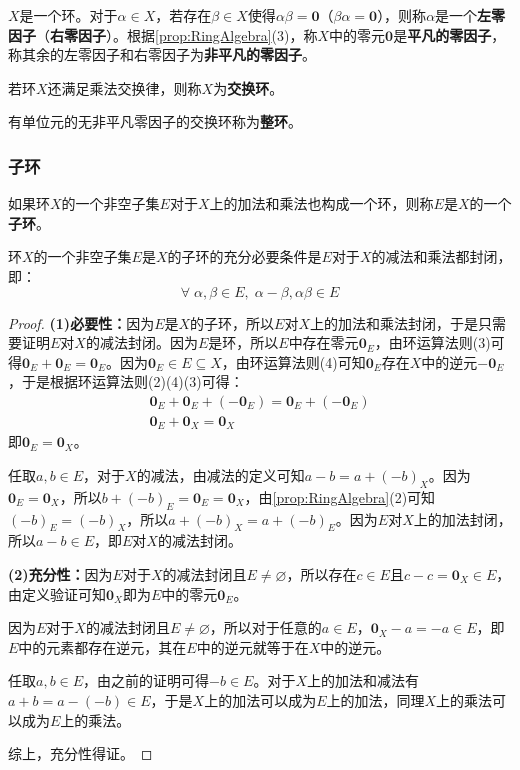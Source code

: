 \begin{definition}
	$X$是一个环。对于$\alpha\in X$，若存在$\beta\in X$使得$\alpha\beta=\mathbf{0}$（$\beta\alpha=\mathbf{0}$），则称$\alpha$是一个\textbf{左零因子}（\textbf{右零因子}）。根据\cref{prop:RingAlgebra}(3)，称$X$中的零元$\mathbf{0}$是\textbf{平凡的零因子}，称其余的左零因子和右零因子为\textbf{非平凡的零因子}。
\end{definition}
\begin{definition}
	若环$X$还满足乘法交换律，则称$X$为\textbf{交换环}。
\end{definition}
\begin{definition}
	有单位元的无非平凡零因子的交换环称为\textbf{整环}。
\end{definition}
\subsubsection{子环}
\begin{definition}
	如果环$X$的一个非空子集$E$对于$X$上的加法和乘法也构成一个环，则称$E$是$X$的一个\textbf{子环}。
\end{definition}
\begin{theorem}
	环$X$的一个非空子集$E$是$X$的子环的充分必要条件是$E$对于$X$的减法和乘法都封闭，即：
	\begin{equation*}
		\forall\;\alpha,\beta\in E,\;\alpha-\beta,\alpha\beta\in E
	\end{equation*}
\end{theorem}
\begin{proof}
	\textbf{(1)必要性：}因为$E$是$X$的子环，所以$E$对$X$上的加法和乘法封闭，于是只需要证明$E$对$X$的减法封闭。因为$E$是环，所以$E$中存在零元$\mathbf{0}_E$，由环运算法则(3)可得$\mathbf{0}_E+\mathbf{0}_E=\mathbf{0}_E$。因为$\mathbf{0}_E\in E\subseteq X$，由环运算法则(4)可知$\mathbf{0}_E$存在$X$中的逆元$-\mathbf{0}_E$，于是根据环运算法则(2)(4)(3)可得：
	\begin{gather*}
		\mathbf{0}_E+\mathbf{0}_E+(-\mathbf{0}_E)=\mathbf{0}_E+(-\mathbf{0}_E) \\
		\mathbf{0}_E+\mathbf{0}_X=\mathbf{0}_X
	\end{gather*}
	即$\mathbf{0}_E=\mathbf{0}_X$。\par
	任取$a,b\in E$，对于$X$的减法，由减法的定义可知$a-b=a+(-b)_X$。因为$\mathbf{0}_E=\mathbf{0}_X$，所以$b+(-b)_E=\mathbf{0}_E=\mathbf{0}_X$，由\cref{prop:RingAlgebra}(2)可知$(-b)_E=(-b)_X$，所以$a+(-b)_X=a+(-b)_E$。因为$E$对$X$上的加法封闭，所以$a-b\in E$，即$E$对$X$的减法封闭。\par
	\textbf{(2)充分性：}因为$E$对于$X$的减法封闭且$E\ne\varnothing$，所以存在$c\in E$且$c-c=\mathbf{0}_X\in E$，由定义验证可知$\mathbf{0}_X$即为$E$中的零元$\mathbf{0}_E$。\par
	因为$E$对于$X$的减法封闭且$E\ne\varnothing$，所以对于任意的$a\in E$，$\mathbf{0}_X-a=-a\in E$，即$E$中的元素都存在逆元，其在$E$中的逆元就等于在$X$中的逆元。\par
	任取$a,b\in E$，由之前的证明可得$-b\in E$。对于$X$上的加法和减法有$a+b=a-(-b)\in E$，于是$X$上的加法可以成为$E$上的加法，同理$X$上的乘法可以成为$E$上的乘法。\par
	综上，充分性得证。
\end{proof}

